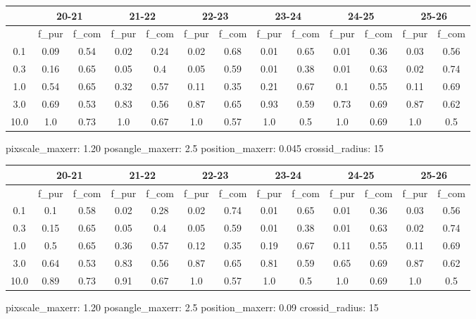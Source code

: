 \documentclass{article}
\begin{document}
\begin{figure}[H]
\centering
\begin{tabular}{|c|c|c|c|c|c|c|c|c|c|c|c|c|}
\hline
\multicolumn{1}{|c|}{} & \multicolumn{2}{|c|}{20-21} & \multicolumn{2}{|c|}{21-22} & \multicolumn{2}{|c|}{22-23} & \multicolumn{2}{|c|}{23-24} & \multicolumn{2}{|c|}{24-25} & \multicolumn{2}{|c|}{25-26}\\
\hline \hline
 & f\_pur & f\_com & f\_pur & f\_com & f\_pur & f\_com & f\_pur & f\_com & f\_pur & f\_com & f\_pur & f\_com \\
\hline
0.1 & 0.09 & 0.54 & 0.02 & 0.24 & 0.02 & 0.68 & 0.01 & 0.65 & 0.01 & 0.36 & 0.03 & 0.56\\
\hline
0.3 & 0.16 & 0.65 & 0.05 & 0.4 & 0.05 & 0.59 & 0.01 & 0.38 & 0.01 & 0.63 & 0.02 & 0.74\\
\hline
1.0 & 0.54 & 0.65 & 0.32 & 0.57 & 0.11 & 0.35 & 0.21 & 0.67 & 0.1 & 0.55 & 0.11 & 0.69\\
\hline
3.0 & 0.69 & 0.53 & 0.83 & 0.56 & 0.87 & 0.65 & 0.93 & 0.59 & 0.73 & 0.69 & 0.87 & 0.62\\
\hline
10.0 & 1.0 & 0.73 & 1.0 & 0.67 & 1.0 & 0.57 & 1.0 & 0.5 & 1.0 & 0.69 & 1.0 & 0.5\\
\hline
\end{tabular}
\caption{pixscale\_maxerr: 1.20 posangle\_maxerr: 2.5 position\_maxerr: 0.045 crossid\_radius: 15}
\end{figure}

\begin{figure}[H]
\centering
\begin{tabular}{|c|c|c|c|c|c|c|c|c|c|c|c|c|}
\hline
\multicolumn{1}{|c|}{} & \multicolumn{2}{|c|}{20-21} & \multicolumn{2}{|c|}{21-22} & \multicolumn{2}{|c|}{22-23} & \multicolumn{2}{|c|}{23-24} & \multicolumn{2}{|c|}{24-25} & \multicolumn{2}{|c|}{25-26}\\
\hline \hline
 & f\_pur & f\_com & f\_pur & f\_com & f\_pur & f\_com & f\_pur & f\_com & f\_pur & f\_com & f\_pur & f\_com \\
\hline
0.1 & 0.1 & 0.58 & 0.02 & 0.28 & 0.02 & 0.74 & 0.01 & 0.65 & 0.01 & 0.36 & 0.03 & 0.56\\
\hline
0.3 & 0.15 & 0.65 & 0.05 & 0.4 & 0.05 & 0.59 & 0.01 & 0.38 & 0.01 & 0.63 & 0.02 & 0.74\\
\hline
1.0 & 0.5 & 0.65 & 0.36 & 0.57 & 0.12 & 0.35 & 0.19 & 0.67 & 0.11 & 0.55 & 0.11 & 0.69\\
\hline
3.0 & 0.64 & 0.53 & 0.83 & 0.56 & 0.87 & 0.65 & 0.81 & 0.59 & 0.65 & 0.69 & 0.87 & 0.62\\
\hline
10.0 & 0.89 & 0.73 & 0.91 & 0.67 & 1.0 & 0.57 & 1.0 & 0.5 & 1.0 & 0.69 & 1.0 & 0.5\\
\hline
\end{tabular}
\caption{pixscale\_maxerr: 1.20 posangle\_maxerr: 2.5 position\_maxerr: 0.09 crossid\_radius: 15}
\end{figure}
\end{document}
